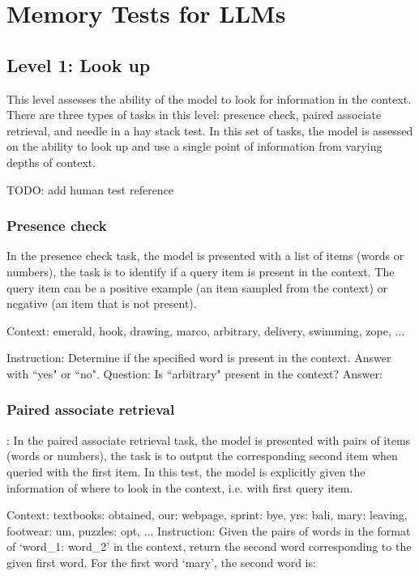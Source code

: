 \section{Memory Tests for LLMs}

\subsection{Level 1: Look up}
This level assesses the ability of the model to look for information in the context. There are three types of tasks in this level: presence check, paired associate retrieval, and needle in a hay stack test. In this set of tasks, the model is assessed on the ability to look up and use a single point of information from varying depths of context. 

TODO: add human test reference

\subsubsection{Presence check}
In the presence check task, the model is presented with a list of items (words or numbers), the task is to identify if a query item is present in the context. The query item can be a positive example (an item sampled from the context) or negative (an item that is not present). 

\begin{tcolorbox}[colback=red!5!white,colframe=red!75!black,title=Example prompt]
Context: emerald, hook, drawing, marco, arbitrary, delivery, swimming, zope, ...

\tcblower
Instruction: Determine if the specified word is present in the context. Answer with ``yes" or ``no".
Question: Is ``arbitrary" present in the context?
Answer:
\end{tcolorbox}
    
\subsubsection{Paired associate retrieval}:
In the paired associate retrieval task, the model is presented with pairs of items (words or numbers), the task is to output the corresponding second item when queried with the first item. In this test, the model is explicitly given the information of where to look in the context, i.e. with first query item. 

\begin{tcolorbox}[colback=red!5!white,colframe=red!75!black,title=Example prompt]
Context: textbooks: obtained, our: webpage, sprint: bye, yrs: bali, mary: leaving, footwear: um, puzzles: opt, ...
\tcblower
Instruction: Given the pairs of words in the format of `word\_1: word\_2' in the context, return the second word corresponding to the given first word. For the first word `mary', the second word is:
\end{tcolorbox}

